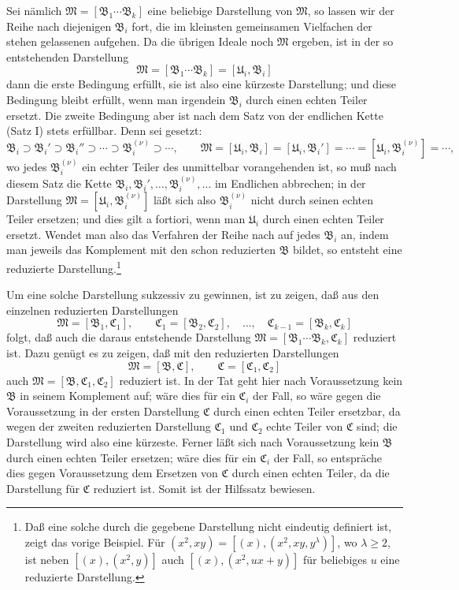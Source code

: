\documentclass[11pt]{article}
\newcommand{\ideal}[1]{\mathfrak{#1}}
\begin{document}
Sei nämlich $\ideal M=[\ideal B_1\cdots\ideal B_k]$ eine beliebige Darstellung von $\ideal M$, so lassen wir der Reihe nach diejenigen $\ideal B_i$ fort, die im kleinsten gemeinsamen Vielfachen der stehen gelassenen aufgehen. Da die übrigen Ideale noch $\ideal M$ ergeben, ist in der so entstehenden Darstellung
\[
 \ideal M=[\ideal B_1\cdots\ideal B_k]=[\ideal U_i,\ideal B_i]
\]
dann die erste Bedingung erfüllt, sie ist also eine kürzeste Darstellung; und diese Bedingung bleibt erfüllt, wenn man irgendein $\ideal B_i$ durch einen echten Teiler ersetzt. Die zweite Bedingung aber ist nach dem Satz von der endlichen Kette (Satz I) stets erfüllbar. Denn sei gesetzt:
\[
 \ideal B_i\supset \ideal B_i'\supset \ideal B_i''\supset\cdots\supset \ideal B_i^{(\nu)}\supset\cdots,
 \qquad
 \ideal M=[\ideal U_i,\ideal B_i]=[\ideal U_i,\ideal B_i']=\cdots=[\ideal U_i,\ideal B_i^{(\nu)}]=\cdots,
\]
wo jedes $\ideal B_i^{(\nu)}$ ein echter Teiler des unmittelbar vorangehenden ist, so muß nach diesem Satz die Kette $\ideal B_i,\ideal B_i',\ldots,\ideal B_i^{(\nu)},\ldots$ im Endlichen abbrechen; in der Darstellung $\ideal M=[\ideal U_i,\ideal B_i^{(\nu)}]$ läßt sich also $\ideal B_i^{(\nu)}$ nicht durch seinen echten Teiler ersetzen; und dies gilt a fortiori, wenn man $\ideal U_i$ durch einen echten Teiler ersetzt. Wendet man also das Verfahren der Reihe nach auf jedes $\ideal B_i$ an, indem man jeweils das Komplement mit den schon reduzierten $\ideal B$ bildet, so entsteht eine reduzierte Darstellung.\footnote{Daß eine solche durch die gegebene Darstellung nicht eindeutig definiert ist, zeigt das vorige Beispiel. Für $(x^2,xy)=[(x),(x^2,xy,y^\lambda)]$, wo $\lambda\ge2$, ist neben $[(x),(x^2,y)]$ auch $[(x),(x^2,ux+y)]$ für beliebiges $u$ eine reduzierte Darstellung.}

Um eine solche Darstellung sukzessiv zu gewinnen, ist zu zeigen, daß aus den einzelnen reduzierten Darstellungen
\[
 \ideal M=[\ideal B_1,\ideal C_1],\qquad
 \ideal C_1=[\ideal B_2,\ideal C_2],\quad\ldots,\quad
 \ideal C_{k-1}=[\ideal B_k,\ideal C_k]
\]
folgt, daß auch die daraus entstehende Darstellung $\ideal M=[\ideal B_1\cdots\ideal B_k,\ideal C_k]$ reduziert ist. Dazu genügt es zu zeigen, daß mit den reduzierten Darstellungen
\[
 \ideal M=[\ideal B,\ideal C],\qquad \ideal C=[\ideal C_1,\ideal C_2]
\]
auch $\ideal M=[\ideal B,\ideal C_1,\ideal C_2]$ reduziert ist. In der Tat geht hier nach Voraussetzung kein $\ideal B$ in seinem Komplement auf; wäre dies für ein $\ideal C_i$ der Fall, so wäre gegen die Voraussetzung in der ersten Darstellung $\ideal C$ durch einen echten Teiler ersetzbar, da wegen der zweiten reduzierten Darstellung $\ideal C_1$ und $\ideal C_2$ echte Teiler von $\ideal C$ sind; die Darstellung wird also eine kürzeste. Ferner läßt sich nach Voraussetzung kein $\ideal B$ durch einen echten Teiler ersetzen; wäre dies für ein $\ideal C_i$ der Fall, so entspräche dies gegen Voraussetzung dem Ersetzen von $\ideal C$ durch einen echten Teiler, da die Darstellung für $\ideal C$ reduziert ist. Somit ist der Hilfssatz bewiesen.
\end{document}
